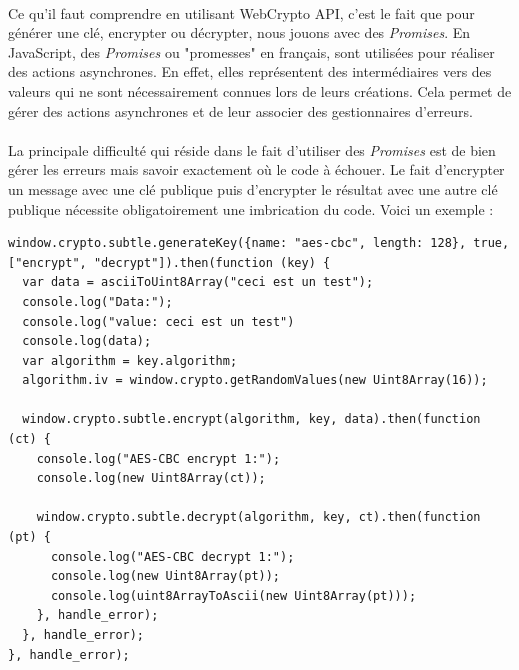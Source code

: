 \documentclass[a4paper,12pt]{report}
\begin{document}
	\paragraph*{}
	Ce qu'il faut comprendre en utilisant WebCrypto API, c'est le fait que pour générer une clé, encrypter ou décrypter, nous jouons avec des \textit{Promises}. En JavaScript, des \textit{Promises} ou "promesses" en français, sont utilisées pour réaliser des actions asynchrones. En effet, elles représentent des intermédiaires vers des valeurs qui ne sont nécessairement connues lors de leurs créations. Cela permet de gérer des actions asynchrones et de leur associer des gestionnaires d'erreurs. 
	\paragraph*{}
	La principale difficulté qui réside dans le fait d'utiliser des \textit{Promises} est de bien gérer les erreurs mais savoir exactement où le code à échouer. Le fait d'encrypter un message avec une clé publique puis d'encrypter le résultat avec une autre clé publique nécessite obligatoirement une imbrication du code.
	Voici un exemple :
	\begin{lstlisting}
window.crypto.subtle.generateKey({name: "aes-cbc", length: 128}, true, ["encrypt", "decrypt"]).then(function (key) {
  var data = asciiToUint8Array("ceci est un test");
  console.log("Data:");
  console.log("value: ceci est un test")
  console.log(data);
  var algorithm = key.algorithm;
  algorithm.iv = window.crypto.getRandomValues(new Uint8Array(16));

  window.crypto.subtle.encrypt(algorithm, key, data).then(function (ct) {
    console.log("AES-CBC encrypt 1:");
    console.log(new Uint8Array(ct));

    window.crypto.subtle.decrypt(algorithm, key, ct).then(function (pt) {
      console.log("AES-CBC decrypt 1:");
      console.log(new Uint8Array(pt));
      console.log(uint8ArrayToAscii(new Uint8Array(pt)));
    }, handle_error);
  }, handle_error);
}, handle_error);
	\end{lstlisting}
\end{document}

